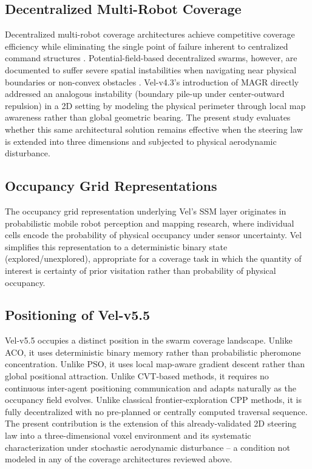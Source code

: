 \documentclass[10pt,journal]{IEEEtran}
\begin{document}
\subsection{Decentralized Multi-Robot Coverage}
Decentralized multi-robot coverage architectures achieve competitive
coverage efficiency while eliminating the single point of failure inherent
to centralized command structures \cite{brambilla2013review}.
Potential-field-based decentralized swarms, however, are documented to
suffer severe spatial instabilities when navigating near physical
boundaries or non-convex obstacles \cite{saska2014cooperative}. Vel-v4.3's
introduction of MAGR directly addressed an analogous instability (boundary
pile-up under center-outward repulsion) in a 2D setting by modeling the
physical perimeter through local map awareness rather than global geometric
bearing. The present study evaluates whether this same architectural
solution remains effective when the steering law is extended into three
dimensions and subjected to physical aerodynamic disturbance.

\subsection{Occupancy Grid Representations}
The occupancy grid representation underlying Vel's SSM layer originates in
probabilistic mobile robot perception and mapping research, where
individual cells encode the probability of physical occupancy under sensor
uncertainty. Vel simplifies this representation to a deterministic binary
state (explored/unexplored), appropriate for a coverage task in which the
quantity of interest is certainty of prior visitation rather than
probability of physical occupancy.

\subsection{Positioning of Vel-v5.5}
Vel-v5.5 occupies a distinct position in the swarm coverage landscape.
Unlike ACO, it uses deterministic binary memory rather than probabilistic
pheromone concentration. Unlike PSO, it uses local map-aware gradient
descent rather than global positional attraction. Unlike CVT-based
methods, it requires no continuous inter-agent positioning communication
and adapts naturally as the occupancy field evolves. Unlike classical
frontier-exploration CPP methods, it is fully decentralized with no
pre-planned or centrally computed traversal sequence. The present
contribution is the extension of this already-validated 2D steering law
into a three-dimensional voxel environment and its systematic
characterization under stochastic aerodynamic disturbance -- a condition
not modeled in any of the coverage architectures reviewed above.
\end{document}
